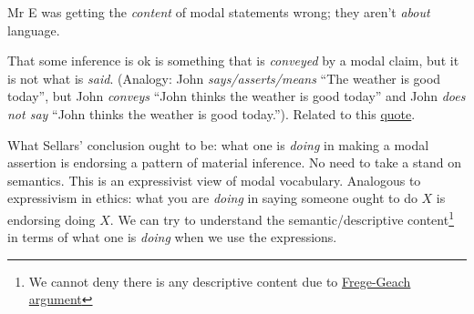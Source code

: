 Mr E was getting the \emph{content} of modal statements wrong; they aren't \emph{about} language.

That some inference is ok is something that is \emph{conveyed} by a modal claim, but it is not what is \emph{said}. (Analogy: John \emph{says/asserts/means} ``The weather is good today'', but John \emph{conveys} ``John thinks the weather is good today'' and John \emph{does not say} ``John thinks the weather is good today.''). Related to this \href{doc/phil/People/Sellars/Quotes/Modalities and norms}{quote}.


What Sellars' conclusion ought to be: what one is \emph{doing} in making a modal assertion is endorsing a pattern of material inference. No need to take a stand on semantics. This is an expressivist view of modal vocabulary. Analogous to expressivism in ethics: what you are \emph{doing} in saying someone ought to do $X$ is endorsing doing $X$. We can try to understand the semantic/descriptive content\footnote{We cannot deny there is any descriptive content due to \href{doc/phil/Phil Problems/Frege Geach}{Frege-Geach argument}} in terms of what one is \emph{doing} when we use the expressions.

